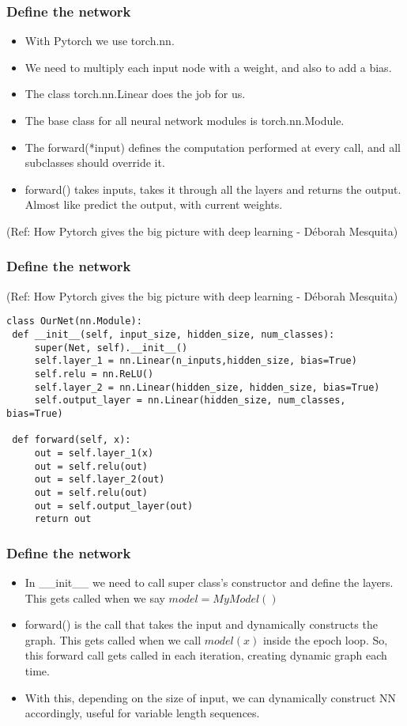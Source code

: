 \begin{frame}[fragile] \frametitle{Define the network}
\begin{itemize}
\item With Pytorch we use torch.nn. 
\item We need to multiply each input node with a weight, and also to add a bias. 
\item The class torch.nn.Linear does the job for us.
\item The base class for all neural network modules is torch.nn.Module.
\item The forward(*input) defines the computation performed at every call, and all subclasses should override it.
\item forward() takes inputs, takes it through all the layers and returns the output. Almost like predict the output, with current weights.
\end{itemize}

  {\tiny (Ref: How Pytorch gives the big picture with deep learning - Déborah Mesquita)}
\end{frame}


\begin{frame}[fragile] \frametitle{Define the network}

  {\tiny (Ref: How Pytorch gives the big picture with deep learning - Déborah Mesquita)}


 \begin{lstlisting}
class OurNet(nn.Module):
 def __init__(self, input_size, hidden_size, num_classes):
     super(Net, self).__init__()
     self.layer_1 = nn.Linear(n_inputs,hidden_size, bias=True)
     self.relu = nn.ReLU()
     self.layer_2 = nn.Linear(hidden_size, hidden_size, bias=True)
     self.output_layer = nn.Linear(hidden_size, num_classes, bias=True)
 
 def forward(self, x):
     out = self.layer_1(x)
     out = self.relu(out)
     out = self.layer_2(out)
     out = self.relu(out)
     out = self.output_layer(out)
     return out
\end{lstlisting}

\end{frame}

\begin{frame}[fragile] \frametitle{Define the network}
\begin{itemize}
\item In \_\_init\_\_ we need to call super class's constructor and define the layers. This gets called when we say $model = MyModel()$
\item forward() is the call that takes the input and dynamically constructs the graph. This gets called when we call $model(x)$ inside the epoch loop. So, this forward call gets called in each iteration, creating dynamic graph each time.
\item With this, depending on the size of input, we can dynamically construct NN accordingly, useful for variable length sequences.
\end{itemize}

\end{frame}


